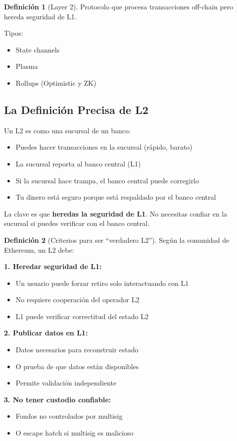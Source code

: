 \documentclass[11pt,a4paper,twoside,openright]{book}
\theoremstyle{definition}
\newtheorem{definition}{Definición}[chapter]
\theoremstyle{plain}
\theoremstyle{remark}
\begin{document}
\begin{definition}[Layer 2]
Protocolo que procesa transacciones off-chain pero hereda seguridad de L1.
\end{definition}

Tipos:
\begin{itemize}
    \item State channels
    \item Plasma
    \item Rollups (Optimistic y ZK)
\end{itemize}

\subsection{La Definición Precisa de L2}

\begin{intuicion}
Un L2 es como una sucursal de un banco:
\begin{itemize}
    \item Puedes hacer transacciones en la sucursal (rápido, barato)
    \item La sucursal reporta al banco central (L1)
    \item Si la sucursal hace trampa, el banco central puede corregirlo
    \item Tu dinero está seguro porque está respaldado por el banco central
\end{itemize}

La clave es que \textbf{heredas la seguridad de L1}. No necesitas confiar en la sucursal si puedes verificar con el banco central.
\end{intuicion}

\begin{definition}[Criterios para ser ``verdadero L2'']
Según la comunidad de Ethereum, un L2 debe:

\textbf{1. Heredar seguridad de L1:}
\begin{itemize}
    \item Un usuario puede forzar retiro solo interactuando con L1
    \item No requiere cooperación del operador L2
    \item L1 puede verificar correctitud del estado L2
\end{itemize}

\textbf{2. Publicar datos en L1:}
\begin{itemize}
    \item Datos necesarios para reconstruir estado
    \item O prueba de que datos están disponibles
    \item Permite validación independiente
\end{itemize}

\textbf{3. No tener custodio confiable:}
\begin{itemize}
    \item Fondos no controlados por multisig
    \item O escape hatch si multisig es malicioso
\end{itemize}
\end{definition}
\end{document}
